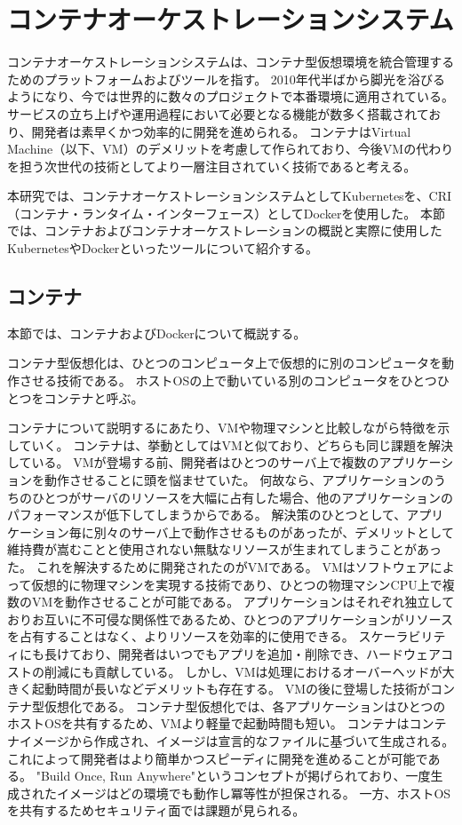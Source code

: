\section{コンテナオーケストレーションシステム}
\label{background:container-orchestration-system}

コンテナオーケストレーションシステムは、コンテナ型仮想環境を統合管理するためのプラットフォームおよびツールを指す。
2010年代半ばから脚光を浴びるようになり、今では世界的に数々のプロジェクトで本番環境に適用されている。
サービスの立ち上げや運用過程において必要となる機能が数多く搭載されており、開発者は素早くかつ効率的に開発を進められる。
コンテナはVirtual Machine（以下、VM）のデメリットを考慮して作られており、今後VMの代わりを担う次世代の技術としてより一層注目されていく技術であると考える。

本研究では、コンテナオーケストレーションシステムとしてKubernetesを、CRI（コンテナ・ランタイム・インターフェース）としてDockerを使用した。
本節では、コンテナおよびコンテナオーケストレーションの概説と実際に使用したKubernetesやDockerといったツールについて紹介する。

\subsection{コンテナ}
\label{background:container-orchestration-system:container}

本節では、コンテナおよびDockerについて概説する。

コンテナ型仮想化は、ひとつのコンピュータ上で仮想的に別のコンピュータを動作させる技術である。
ホストOSの上で動いている別のコンピュータをひとつひとつをコンテナと呼ぶ。

コンテナについて説明するにあたり、VMや物理マシンと比較しながら特徴を示していく。
コンテナは、挙動としてはVMと似ており、どちらも同じ課題を解決している。
VMが登場する前、開発者はひとつのサーバ上で複数のアプリケーションを動作させることに頭を悩ませていた。
何故なら、アプリケーションのうちのひとつがサーバのリソースを大幅に占有した場合、他のアプリケーションのパフォーマンスが低下してしまうからである。
解決策のひとつとして、アプリケーション毎に別々のサーバ上で動作させるものがあったが、デメリットとして維持費が嵩むことと使用されない無駄なリソースが生まれてしまうことがあった。
これを解決するために開発されたのがVMである。
VMはソフトウェアによって仮想的に物理マシンを実現する技術であり、ひとつの物理マシンCPU上で複数のVMを動作させることが可能である。
アプリケーションはそれぞれ独立しておりお互いに不可侵な関係性であるため、ひとつのアプリケーションがリソースを占有することはなく、よりリソースを効率的に使用できる。
スケーラビリティにも長けており、開発者はいつでもアプリを追加・削除でき、ハードウェアコストの削減にも貢献している。
しかし、VMは処理におけるオーバーヘッドが大きく起動時間が長いなどデメリットも存在する。
VMの後に登場した技術がコンテナ型仮想化である。
コンテナ型仮想化では、各アプリケーションはひとつのホストOSを共有するため、VMより軽量で起動時間も短い。
コンテナはコンテナイメージから作成され、イメージは宣言的なファイルに基づいて生成される。
これによって開発者はより簡単かつスピーディに開発を進めることが可能である。
"Build Once, Run Anywhere"というコンセプトが掲げられており、一度生成されたイメージはどの環境でも動作し冪等性が担保される。
一方、ホストOSを共有するためセキュリティ面では課題が見られる。

